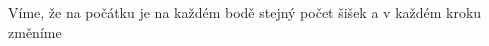 \documentclass{fkssolpub}
\author{Ondřej Sedláček}
\begin{document}
Víme, že na počátku je na každém bodě stejný počet šišek a v každém kroku změníme 
\end{document}
